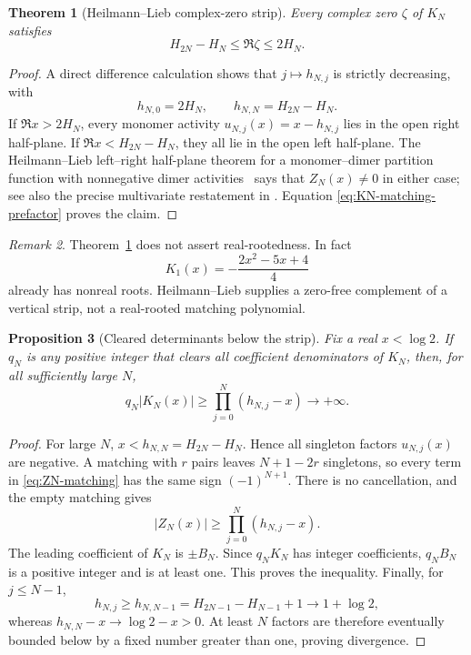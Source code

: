 \documentclass[11pt]{article}
\newtheorem{theorem}{Theorem}[section]
\newtheorem{proposition}[theorem]{Proposition}
\theoremstyle{definition}
\theoremstyle{remark}
\newtheorem{remark}[theorem]{Remark}
\begin{document}
\begin{theorem}[Heilmann--Lieb complex-zero strip]
\label{thm:KN-zero-strip}
Every complex zero \(\zeta\) of \(K_N\) satisfies
\begin{equation}
 \boxed{H_{2N}-H_N\leq\Re\zeta\leq2H_N.}
 \label{eq:KN-zero-strip}
\end{equation}
\end{theorem}

\begin{proof}
A direct difference calculation shows that \(j\mapsto h_{N,j}\) is strictly
decreasing, with
\[
 h_{N,0}=2H_N,
 \qquad
 h_{N,N}=H_{2N}-H_N.
\]
If \(\Re x>2H_N\), every monomer activity
\(u_{N,j}(x)=x-h_{N,j}\) lies in the open right half-plane.  If
\(\Re x<H_{2N}-H_N\), they all lie in the open left half-plane.  The
Heilmann--Lieb left--right half-plane theorem for a monomer--dimer partition
function with nonnegative dimer activities~\cite[Theorem~4.6 and
Lemma~4.7]{HeilmannLieb1972} says that \(Z_N(x)\neq0\) in either case; see also
the precise multivariate restatement in
\cite[Theorem~10.1]{ChoeOxleySokalWagner2004}.  Equation
\eqref{eq:KN-matching-prefactor} proves the claim.
\end{proof}

\begin{remark}
Theorem~\ref{thm:KN-zero-strip} does not assert real-rootedness.  In fact
\[
 K_1(x)=-\frac{2x^2-5x+4}{4}
\]
already has nonreal roots.  Heilmann--Lieb supplies a zero-free complement of
a vertical strip, not a real-rooted matching polynomial.
\end{remark}

\begin{proposition}[Cleared determinants below the strip]
\label{prop:KN-divergence}
Fix a real \(x<\log2\).  If \(q_N\) is any positive integer that clears all
coefficient denominators of \(K_N\), then, for all sufficiently large \(N\),
\begin{equation}
 q_N|K_N(x)|
 \geq\prod_{j=0}^N(h_{N,j}-x)
 \longrightarrow+\infty.
 \label{eq:KN-cleared-divergence}
\end{equation}
\end{proposition}

\begin{proof}
For large \(N\), \(x<h_{N,N}=H_{2N}-H_N\).  Hence all singleton factors
\(u_{N,j}(x)\) are negative.  A matching with \(r\) pairs leaves
\(N+1-2r\) singletons, so every term in \eqref{eq:ZN-matching} has the same
sign \((-1)^{N+1}\).  There is no cancellation, and the empty matching gives
\[
 |Z_N(x)|\geq\prod_{j=0}^N(h_{N,j}-x).
\]
The leading coefficient of \(K_N\) is \(\pm B_N\).  Since \(q_NK_N\) has
integer coefficients, \(q_NB_N\) is a positive integer and is at least one.
This proves the inequality.  Finally, for \(j\leq N-1\),
\[
 h_{N,j}\geq h_{N,N-1}
 =H_{2N-1}-H_{N-1}+1\longrightarrow1+\log2,
\]
whereas \(h_{N,N}-x\to\log2-x>0\).  At least \(N\) factors are therefore
eventually bounded below by a fixed number greater than one, proving
divergence.
\end{proof}
\end{document}

